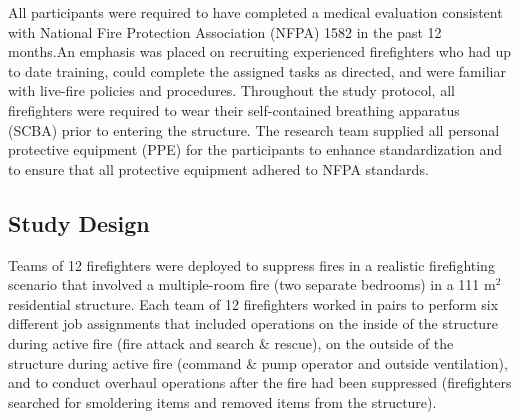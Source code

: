 \documentclass[12pt,oneside]{article}
\begin{document}
All participants were required to have completed a medical evaluation consistent with National Fire Protection Association (NFPA) 1582 in the past 12 months.An emphasis was placed on recruiting  experienced firefighters who had up to date training, could complete the assigned tasks as directed, and were familiar with live-fire policies and procedures. Throughout the study protocol, all firefighters were required to wear their self-contained breathing apparatus (SCBA) prior to entering the structure. The research team supplied all personal protective equipment (PPE) for the participants to enhance standardization and to ensure that all protective equipment adhered to NFPA standards.

\subsection{Study Design}


Teams of 12 firefighters were deployed to suppress fires in a realistic firefighting scenario that involved a multiple-room fire (two separate bedrooms) in a 111 m$^2$ residential structure. Each team of 12 firefighters worked in pairs to perform six different job assignments that included operations on the inside of the structure during active fire (fire attack and search \& rescue), on the outside of the structure during active fire (command \& pump operator and outside ventilation), and to conduct overhaul operations after the fire had been suppressed (firefighters searched for smoldering items and removed items from the structure).  
\end{document}

